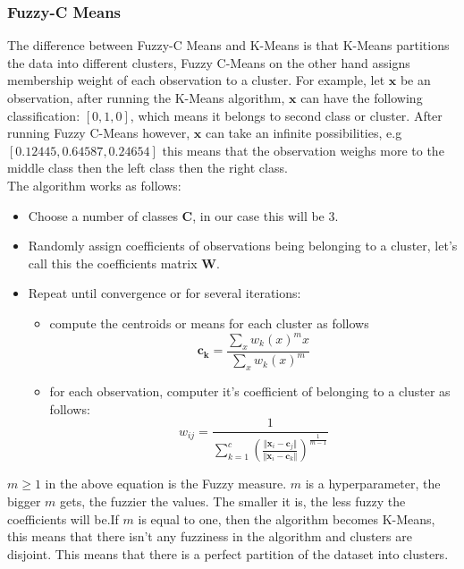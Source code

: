 \begin{multicols*}{2}
    \subsubsection{Fuzzy-C Means}
    The difference between Fuzzy-C Means and K-Means is that K-Means partitions the data into different clusters, Fuzzy C-Means on the other hand assigns membership weight of each observation to a cluster. For example, let $\mathbf{x}$ be an observation, after running the K-Means algorithm, $\mathbf{x}$ can have the following classification: $[0 , 1 , 0]$, which means it belongs to second class or cluster. After running Fuzzy C-Means however, $\mathbf{x}$ can take an infinite possibilities, e.g $[0.12445 , 0.64587 , 0.24654]$ this means that the observation weighs more to the middle class then the left class then the right class.\\
    The algorithm works as follows:
    \begin{itemize}
        \item Choose a number of classes $\mathbf{C}$, in our case this will be 3.
        \item Randomly assign coefficients of observations being belonging to a cluster, let's call this the coefficients matrix $\mathbf{W}$.
        \item Repeat until convergence or for several iterations:
            \begin{itemize}
                \item compute the centroids or means for each cluster as follows
                \begin{equation}
                    \mathbf{c_k} = \frac{\sum_xw_k(x)^mx}{\sum_xw_k(x)^m}
                \end{equation}
                \item for each observation, computer it's coefficient of belonging to a cluster as follows:
                \begin{equation}
                    w_{ij} = \frac{1}{\sum_{k=1}^c(\frac{\Vert\mathbf{x}_i-\mathbf{c}_j \Vert}{\Vert\mathbf{x}_i-\mathbf{c}_k \Vert})^{\frac{1}{m-1}}}
                \end{equation}
            \end{itemize}
    \end{itemize}

    $m \geq 1$ in the above equation is the Fuzzy measure. $m$ is a hyperparameter, the bigger $m$ gets, the fuzzier the values. The smaller it is, the less fuzzy the coefficients will be.If $m$ is equal to one, then the algorithm becomes K-Means, this means that there isn't any fuzziness in the algorithm and clusters are disjoint. This means that there is a perfect partition of the dataset into clusters.


\end{multicols*}

